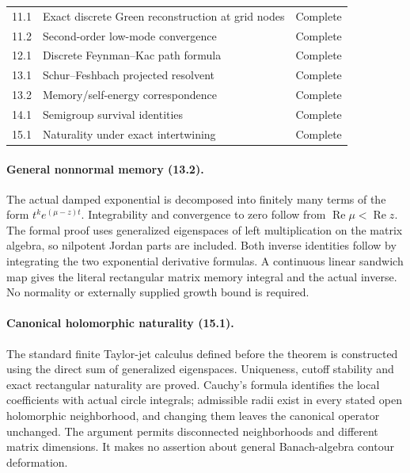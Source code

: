 \documentclass[11pt,a4paper]{article}
\theoremstyle{definition}
\theoremstyle{remark}
\begin{document}
\begin{longtable}{@{}p{}p{}p{}@{}}
11.1 & Exact discrete Green reconstruction at grid nodes & Complete\\
11.2 & Second-order low-mode convergence & Complete\\
12.1 & Discrete Feynman--Kac path formula & Complete\\
13.1 & Schur--Feshbach projected resolvent & Complete\\
13.2 & Memory/self-energy correspondence & Complete\\
14.1 & Semigroup survival identities & Complete\\
15.1 & Naturality under exact intertwining & Complete\\
\end{longtable}
\normalsize

\paragraph{General nonnormal memory (13.2).}
The actual damped exponential is decomposed into finitely many terms of the form
$t^k e^{(\mu-z)t}$. Integrability and convergence to zero follow from
$\operatorname{Re}\mu<\operatorname{Re}z$. The formal proof uses generalized
eigenspaces of left multiplication on the matrix algebra, so nilpotent Jordan
parts are included. Both inverse identities follow by integrating the two
exponential derivative formulas. A continuous linear sandwich map gives the
literal rectangular matrix memory integral and the actual inverse. No normality
or externally supplied growth bound is required.

\paragraph{Canonical holomorphic naturality (15.1).}
The standard finite Taylor-jet calculus defined before the theorem is constructed
using the direct sum of generalized eigenspaces. Uniqueness, cutoff stability and
exact rectangular naturality are proved. Cauchy's formula identifies the local
coefficients with actual circle integrals; admissible radii exist in every stated
open holomorphic neighborhood, and changing them leaves the canonical operator
unchanged. The argument permits disconnected neighborhoods and different matrix
dimensions. It makes no assertion about general Banach-algebra contour deformation.
\end{document}
